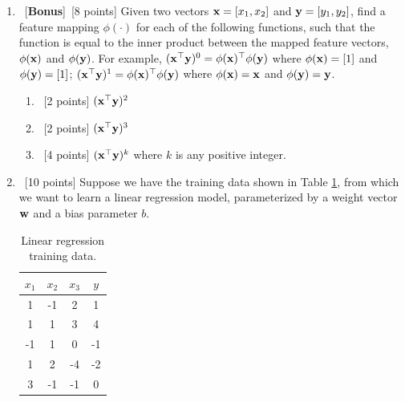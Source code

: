 \documentclass[12pt, fullpage,letterpaper]{article}
\begin{document}
\begin{enumerate}
	
	\item~[\textbf{Bonus}]~[8 points]  Given two vectors ${\bf x} = [x_1,  x_2]$ and ${\bf y}=[y_1,  y_2]$, find a feature mapping $\phi(\cdot)$ for each of the following functions, such that the function is equal to the inner product between the mapped feature vectors, $\phi({\bf x})$ and $\phi({\bf y})$. For example, $({\bf x}^\top {\bf y})^0 = \phi({\bf x})^\top \phi({\bf y})$ where $\phi({\bf x}) = [1]$ and $\phi({\bf y}) = [1]$; $({\bf x}^\top {\bf y})^1 = \phi({\bf x})^\top \phi({\bf y})$ where $\phi({\bf x}) = {\bf x}$ and $\phi({\bf y}) = {\bf y}$. 
	\begin{enumerate}
		\item~[2 points] $({\bf x}^\top {\bf y})^2$
		\item~[2 points] $({\bf x}^\top {\bf y})^3$
		\item~[4 points] $({\bf x}^\top {\bf y})^k$ where $k$ is  any positive integer.  
	\end{enumerate}

\item~[10 points] Suppose we have the training data shown in Table \ref{tb:1}, from which we want to learn a linear regression model, parameterized by a weight vector ${\bf w}$ and a bias parameter $b$.  
\begin{table}
	\centering
	\begin{tabular}{ccc|c}
		$x_1 $ & $x_2$ & $x_3$ &  $y$\\ 
		\hline\hline
		1 & -1 & 2 & 1 \\ \hline
		1 & 1 & 3 & 4 \\ \hline
		-1 & 1 & 0 & -1 \\ \hline
		1 & 2 & -4 & -2 \\ \hline
		3 & -1 & -1 & 0\\ \hline
	\end{tabular}
	\caption{Linear regression training data.}\label{tb:1}
\end{table}


\end{enumerate}
\end{document}
